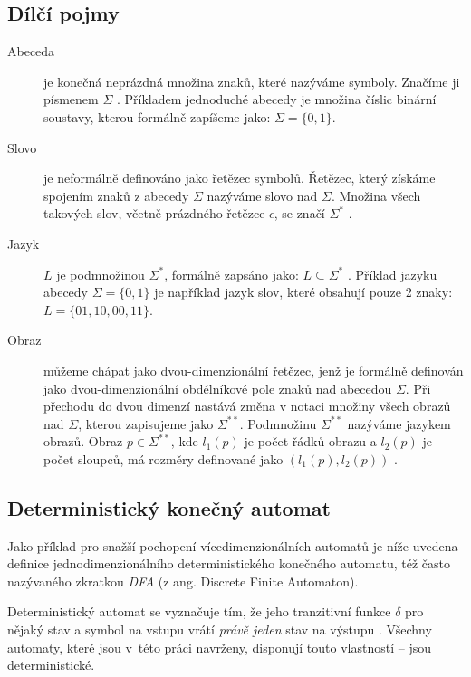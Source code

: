 \subsection*{Dílčí pojmy}
\begin{description}
    \item[Abeceda] je konečná neprázdná množina znaků, které nazýváme symboly. Značíme ji písmenem $\Sigma$ \cite{MedunaAlexander2012Aalt}.  Příkladem jednoduché abecedy je množina číslic binární soustavy, kterou formálně zapíšeme jako: $\Sigma = \{0, 1\}$.
    
    \item[Slovo] je neformálně definováno jako řetězec symbolů. Řetězec, který získáme spojením znaků z abecedy $\Sigma$ nazýváme slovo nad $\Sigma$. Množina všech takových slov, včetně prázdného řetězce $\epsilon$, se značí $\Sigma^{*}$ \cite{MedunaAlexander2012Aalt}.
    
    \item[Jazyk] $L$ je podmnožinou $\Sigma^{*}$, formálně zapsáno jako: $L \subseteq \Sigma^{*}$ \cite{MedunaAlexander2012Aalt}. Příklad jazyku abecedy $\Sigma = \{0, 1\}$ je například jazyk slov, které obsahují pouze 2 znaky: $L = \{01, 10, 00, 11\}$.
    
    \item[Obraz] můžeme chápat jako dvou-dimenzionální řetězec, jenž je formálně definován jako dvou-dimenzionální obdélníkové pole znaků nad abecedou $\Sigma$. Při přechodu do dvou dimenzí nastává změna v notaci množiny všech obrazů nad $\Sigma$, kterou zapisujeme jako $\Sigma^{**}$. Podmnožinu $\Sigma^{**}$ nazýváme jazykem obrazů. Obraz $p \in \Sigma^{**}$, kde $l_{1}(p)$ je počet řádků obrazu a  $l_{2}(p)$ je počet sloupců, má rozměry definované jako $(l_{1}(p), l_{2}(p))$ \cite{RozenbergGrzegorz1997HoFL}.
\end{description}

\subsection*{Deterministický konečný automat}

Jako příklad pro snažší pochopení vícedimenzionálních automatů je níže uvedena definice jednodimenzionálního deterministického konečného automatu, též často nazývaného zkratkou \emph{DFA} (z ang. Discrete Finite Automaton).

Deterministický automat se vyznačuje tím, že jeho tranzitivní funkce $\delta$ pro nějaký stav a symbol na vstupu vrátí \emph{právě jeden} stav na výstupu \cite{HopcroftJohnE.2007Itat}. Všechny automaty, které jsou v~této práci navrženy, disponují touto vlastností -- jsou deterministické.


